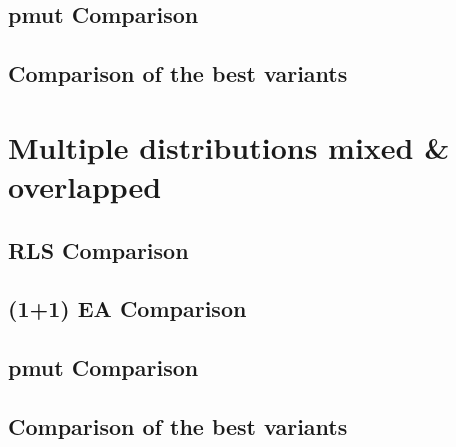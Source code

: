 


\subsection{pmut Comparison}





\subsection{Comparison of the best variants}





\section{Multiple distributions mixed \& overlapped}

\subsection{RLS Comparison}





\subsection{(1+1) EA Comparison}





\subsection{pmut Comparison}





\subsection{Comparison of the best variants}





